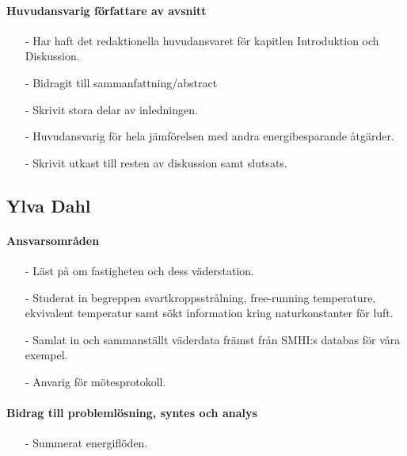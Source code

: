 \documentclass[12pt,a4paper]{article}
\begin{document}
\paragraph{Huvudansvarig författare av avsnitt}

\begin{itemize}
\item[-] Har haft det redaktionella huvudansvaret för kapitlen Introduktion och Diskussion.
\item[-] Bidragit till sammanfattning/abstract
\item[-] Skrivit stora delar av inledningen.
\item[-] Huvudansvarig för hela jämförelsen med andra energibesparande åtgärder.
\item[-] Skrivit utkast till resten av diskussion samt slutsats.
\end{itemize}




\subsection*{Ylva Dahl}

\paragraph{Ansvarsområden}

\begin{itemize}
\item[-] Läst på om fastigheten och dess väderstation.
\item[-] Studerat in begreppen svartkroppsstrålning, free-running temperature, ekvivalent temperatur samt sökt information kring naturkonstanter för luft.
\item[-] Samlat in och sammanställt väderdata främst från SMHI:s databas för våra exempel.
\item[-] Anvarig för mötesprotokoll.
\end{itemize}

\paragraph{Bidrag till problemlösning, syntes och analys}
\begin{itemize}
\item[-] Summerat energiflöden.
\end{itemize}
\end{document}
